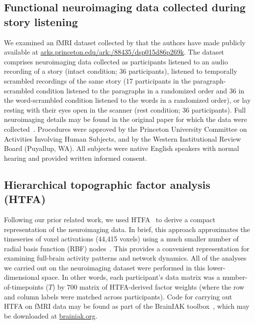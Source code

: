 \documentclass[english, 11pt]{article}
\begin{document}
\subsection*{Functional neuroimaging data collected during story
  listening}

We examined an fMRI dataset collected by \cite{SimoEtal16} that the authors
have made publicly available at
\href{http://arks.princeton.edu/ark:/88435/dsp015d86p269k}{arks.princeton.edu/ark:/88435/dsp015d86p269k}.
The dataset comprises neuroimaging data collected as participants listened to
an audio recording of a story (intact condition; 36 participants), listened to
temporally scrambled recordings of the same story (17 participants in the
paragraph-scrambled condition listened to the paragraphs in a randomized order
and 36 in the word-scrambled condition listened to the words in a randomized
order), or lay resting with their eyes open in the scanner (rest condition; 36
participants). Full neuroimaging details may be found in the original paper for
which the data were collected~\citep{SimoEtal16}. Procedures were approved by
the Princeton University Committee on Activities Involving Human Subjects, and
by the Western Institutional Review Board (Puyallup, WA). All subjects were
native English speakers with normal hearing and provided written informed
consent.

\subsection*{Hierarchical topographic factor analysis (HTFA)}

Following our prior related work, we used HTFA~\citep{MannEtal18} to derive a
compact representation of the neuroimaging data. In brief, this approach
approximates the timeseries of voxel activations (44,415 voxels) using a much
smaller number of radial basis function (RBF) nodes~\citep[in this case, 700
nodes, as determined by an optimization procedure;][]{MannEtal18}. This
provides a convenient representation for examining full-brain activity patterns
and network dynamics. All of the analyses we carried out on the neuroimaging
dataset were performed in this lower-dimensional space. In other words, each
participant's data matrix was a number-of-timepoints ($T$) by 700 matrix of
HTFA-derived factor weights (where the row and column labels were matched
across participants). Code for carrying out HTFA on fMRI data may be found as
part of the BrainIAK toolbox~\citep{CapoEtal17, KumaEtal21}, which may be
downloaded at \href{https://brainiak.org/}{brainiak.org}.
\end{document}
